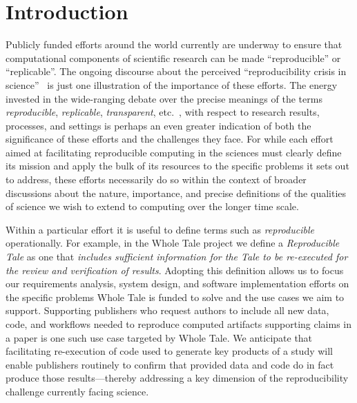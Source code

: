
\section{Introduction}

Publicly funded efforts around the world currently are underway to 
	ensure that computational components of scientific research
	can be made ``reproducible'' or ``replicable''.
The ongoing discourse about the perceived ``reproducibility crisis in science''~\cite{fanelli_opinion:_2018} 
	is just one illustration of the importance of these efforts.
The energy invested in the wide-ranging debate over the precise meanings of the 
	terms \emph{reproducible}, \emph{replicable},
        \emph{transparent}, etc.\
        \cite{drummond2009replicability,carolegoble2016what,freire2016reproducibilitya,goodman2016what,ioannidis2017reproducibility,herouxtoward,plesser2018reproducibility,barba2018terminologies,committeeonreproducibilityandreplicabilityinscience2019reproducibility}, with 
	respect to research results, processes, and settings is perhaps an even greater indication of 
	both the significance of these efforts and the challenges they face.
For while each effort aimed at facilitating reproducible computing in the
	sciences must clearly define its mission and apply the bulk of its resources
	to the specific problems it sets out to address, these efforts necessarily do
	so within the context of broader discussions about the nature, importance,
	and precise definitions of the qualities of science we wish to extend to computing
	over the longer time scale.

Within a particular effort it is useful to define terms such as \emph{reproducible} operationally.
For example, in the Whole Tale project \cite{WT2019,brinckman2019computing} we define a \emph{Reproducible Tale} as one 
	that \emph{includes sufficient information for the Tale to be re-executed for the review 
	and verification of results}.
Adopting this definition allows us to focus our requirements analysis, system design,
	and software implementation efforts on the specific problems Whole Tale is funded to solve
	and the use cases we aim to support.
Supporting publishers who request authors to include all new data, 
	code, and workflows needed to reproduce computed artifacts supporting
	claims in a paper is one such use case targeted by Whole Tale.
We anticipate that facilitating re-execution of code used to generate
	key products of a study will enable publishers routinely to confirm that
	provided data and code do in fact produce those results---thereby addressing
	a key dimension of the reproducibility challenge currently facing science.

